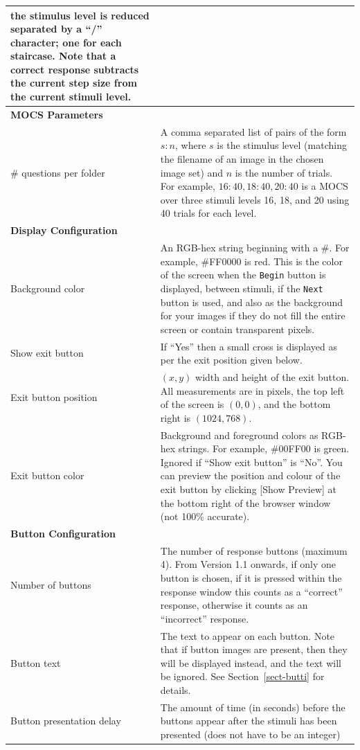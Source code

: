 \documentclass{article}
\begin{document}
\begin{longtable}{|p{5cm}|p{10cm}|}
            the stimulus level is reduced
            separated by a ``/'' character; one for each staircase.
            Note
            that a correct response subtracts the current step size from the 
            current stimuli level.\\
\hline
\hline
{\bf MOCS Parameters} & \\\nopagebreak
\# questions per folder & A comma separated list of pairs of the form $s:n$, where $s$ is the stimulus
level (matching the filename of an image in the chosen image set) and $n$ is the number of trials. For
example, $16:40,18:40,20:40$ is a MOCS over three stimuli levels 16, 18, and 20 using 40 trials for
each level.\\
\hline
\hline
{\bf Display Configuration} & \\\nopagebreak
Background color & An RGB-hex string beginning with a \#. For example, \#FF0000 is red. This is the
color of the screen when the {\tt Begin} button is displayed, between stimuli, 
    if the {\tt Next} button is used, 
and also as the background for your images if they do
not fill the entire screen or contain transparent pixels.\\ 
\hline
Show exit button & If ``Yes'' then a small cross is displayed as per the exit position given below.\\
\hline
Exit button position & $(x,y)$ width and height
of the exit button. All measurements are in pixels, the top left of the screen is $(0,0)$, and the bottom right is $(1024,768)$.\\
\hline
Exit button color & Background and foreground colors as RGB-hex strings. For example, \#00FF00 is
green. Ignored if ``Show exit button'' is ``No''. You can preview the position and colour of the exit button by clicking [Show Preview] at the bottom right of the browser window (not 100\% accurate).\\
\hline
\hline
{\bf Button Configuration} & \\\nopagebreak
Number of buttons & The number of response buttons (maximum 4). From Version 1.1 onwards, 
if only one button is chosen, if it is pressed within the response window this counts as a ``correct'' response,
otherwise it counts as an ``incorrect'' response.\\
\hline
Button text & The text to appear on each button. 
Note that if button images are
present, then they will be displayed instead, and the text will be ignored. See
Section~\ref{sect-butti} for details.\\
\hline
Button presentation delay & The amount of time (in seconds) before the buttons appear after the stimuli has been presented (does not have to be an integer)\\

\end{longtable}
\end{document}
